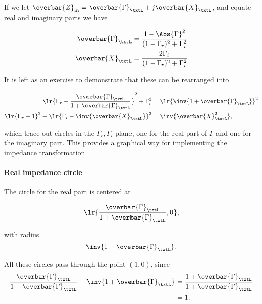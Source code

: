 If we let \( \overbar{Z}_{\textrm{in}} = \overbar{\Gamma}_\txtL + j \overbar{X}_\txtL \), and equate real and imaginary parts we have

\begin{equation}\label{eqn:uwavesDeck5SmithChartCore:420}
\begin{aligned}
\overbar{\Gamma}_\txtL &= \frac{ 1 - \Abs{\Gamma}^2 }{ (1 - \Gamma_r)^2 + \Gamma_i^2 } \\
\overbar{X}_\txtL &= \frac{2 \Gamma_i }{ (1 - \Gamma_r)^2 + \Gamma_i^2 }
\end{aligned}
\end{equation}

It is left as an exercise to demonstrate that these can be rearranged into

\begin{equation}\label{eqn:uwavesDeck5SmithChartCore:440}
\begin{aligned}
\lr{ \Gamma_r - \frac{\overbar{\Gamma}_\txtL}{1 + \overbar{\Gamma}_\txtL } }^2 + \Gamma_i^2 &= \lr{ \inv{1 + \overbar{\Gamma}_\txtL }}^2 \\
\lr{ \Gamma_r - 1 }^2 + \lr{ \Gamma_i - \inv{\overbar{X}_\txtL } }^2 &= \inv{\overbar{X}_\txtL^2},
\end{aligned}
\end{equation}

which trace out circles in the \( \Gamma_r, \Gamma_i \) plane, one for the real part of \( \Gamma \) and one for the imaginary part.  This provides a graphical way for implementing the impedance transformation.

\paragraph{Real impedance circle}

The circle for the real part is centered at

\begin{equation}\label{eqn:uwavesDeck5SmithChartCore:580}
\lr{ \frac{\overbar{\Gamma}_\txtL}{1 + \overbar{\Gamma}_\txtL }, 0 },
\end{equation}

with radius
\begin{equation}\label{eqn:uwavesDeck5SmithChartCore:600}
\inv{1 + \overbar{\Gamma}_\txtL }.
\end{equation}

All these circles pass through the point \( (1,0) \), since
\begin{equation}\label{eqn:uwavesDeck5SmithChartCore:620}
\begin{aligned}
\frac{\overbar{\Gamma}_\txtL}{1 + \overbar{\Gamma}_\txtL } + \inv{1 + \overbar{\Gamma}_\txtL }
&=
\frac{1 + \overbar{\Gamma}_\txtL}{1 + \overbar{\Gamma}_\txtL }
\\ &= 1.
\end{aligned}
\end{equation}


